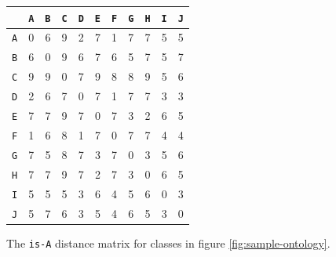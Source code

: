 \begin{figure}[t]
\begin{minipage}[b]{0.45\linewidth}
\begin{tabular}{ |c|c|c|c|c|c|c|c|c|c|c| }
  \hline
  & \texttt{A} & \texttt{B} & \texttt{C} & \texttt{D} & \texttt{E} & \texttt{F} & \texttt{G} & \texttt{H} & \texttt{I} & \texttt{J} \\
  \hline
    \texttt{A}  &  0  &  6  &  9  &  2  &  7  &  1  &  7  &  7  &  5  &  5 \\
    \texttt{B}  &  6  &  0  &  9  &  6  &  7  &  6  &  5  &  7  &  5  &  7 \\
    \texttt{C}  &  9  &  9  &  0  &  7  &  9  &  8  &  8  &  9  &  5  &  6 \\
    \texttt{D}  &  2  &  6  &  7  &  0  &  7  &  1  &  7  &  7  &  3  &  3 \\
    \texttt{E}  &  7  &  7  &  9  &  7  &  0  &  7  &  3  &  2  &  6  &  5 \\
    \texttt{F}  &  1  &  6  &  8  &  1  &  7  &  0  &  7  &  7  &  4  &  4 \\
    \texttt{G}  &  7  &  5  &  8  &  7  &  3  &  7  &  0  &  3  &  5  &  6 \\
    \texttt{H}  &  7  &  7  &  9  &  7  &  2  &  7  &  3  &  0  &  6  &  5 \\
    \texttt{I}  &  5  &  5  &  5  &  3  &  6  &  4  &  5  &  6  &  0  &  3 \\
    \texttt{J}  &  5  &  7  &  6  &  3  &  5  &  4  &  6  &  5  &  3  &  0 \\
  \hline
\end{tabular}
\caption{The \texttt{is-A} distance matrix for classes in figure \ref{fig:sample-ontology}.}
\label{tbl:semantic-distance}
\end{minipage}
\end{figure}

